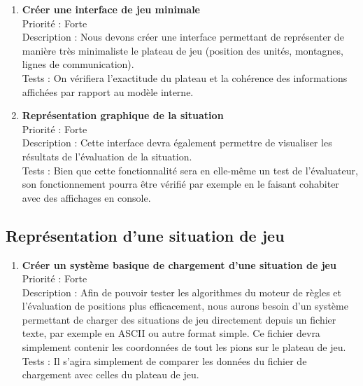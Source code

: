 			\begin{enumerate}

				\item \textbf{Créer une interface de jeu minimale} 
				\\[0.7\baselineskip]
				Priorité : Forte 
				\\[0.7\baselineskip]
				Description : Nous devons créer une interface permettant de représenter de manière très minimaliste le plateau de jeu (position des unités, 
				montagnes, lignes de communication). 
				\\[0.7\baselineskip]
				Tests : On vérifiera l'exactitude du plateau et la cohérence des informations affichées par rapport au modèle interne. 
				\\[0.7\baselineskip]

				\item \textbf{Représentation graphique de la situation} 
				\\[0.7\baselineskip]
				Priorité : Forte 
				\\[0.7\baselineskip]
				Description : Cette interface devra également permettre de visualiser les résultats de l'évaluation de la situation.
				\\[0.7\baselineskip]
				Tests : Bien que cette fonctionnalité sera en elle-même un test de l'évaluateur, son fonctionnement pourra être vérifié par exemple en 
				le faisant cohabiter avec des affichages en console. 
				\\[0.7\baselineskip]

				
			\end{enumerate}

		\subsection{Représentation d'une situation de jeu}

			\begin{enumerate}

				\item \textbf{Créer un système basique de chargement d'une situation de jeu} 
				\\[0.7\baselineskip]
				Priorité : Forte 
				\\[0.7\baselineskip]
				Description : Afin de pouvoir tester les algorithmes du moteur de règles et l'évaluation de positions plus efficacement, nous aurons besoin 
				d'un système permettant de charger des situations de jeu directement depuis un fichier texte, par exemple en ASCII ou autre format simple. 
				Ce fichier devra simplement contenir les coordonnées de tout les pions sur le plateau de jeu. 
				\\[0.7\baselineskip]
				Tests : Il s'agira simplement de comparer les données du fichier de chargement avec celles du plateau de jeu. 
				\\[0.7\baselineskip]
				
			\end{enumerate}

